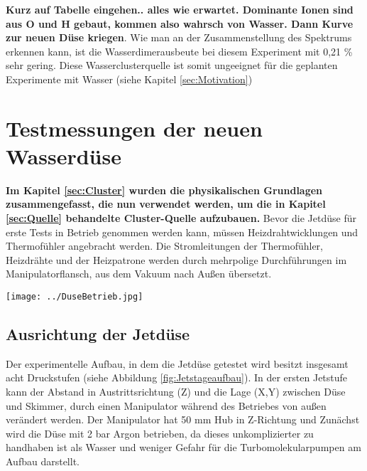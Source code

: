 \textbf{Kurz auf Tabelle eingehen.. alles wie erwartet. Dominante Ionen sind aus O und H gebaut, kommen also wahrsch von Wasser. Dann Kurve zur neuen Düse kriegen}.
Wie man an der Zusammenstellung des Spektrums erkennen kann, ist die Wasserdimerausbeute bei diesem Experiment mit 0,21 \% sehr gering. Diese Wasserclusterquelle ist somit ungeeignet für die geplanten Experimente mit Wasser (siehe Kapitel \ref{sec:Motivation})

\section{Testmessungen der neuen Wasserdüse}

\textbf{Im Kapitel \ref{sec:Cluster} wurden die physikalischen Grundlagen zusammengefasst, die nun verwendet werden, um die in Kapitel \ref{sec:Quelle} \textbf{behandelte} Cluster-Quelle aufzubauen.}
Bevor die Jetdüse für erste Tests in Betrieb genommen werden kann, müssen Heizdrahtwicklungen und Thermofühler angebracht werden. Die Stromleitungen der Thermofühler, Heizdrähte und der Heizpatrone werden durch mehrpolige Durchführungen im Manipulatorflansch, aus dem Vakuum nach Außen übersetzt. 

\begin{center}
\begin{minipage}{\linewidth}
\centering
\texttt{[image: ../DuseBetrieb.jpg]}%
 \label{fig:DuseBetrieb}
\end{minipage} 
\end{center} 

\subsection{Ausrichtung der Jetdüse} \label{sec:Ausrichtung der Jetduse}

Der experimentelle Aufbau, in dem die Jetdüse getestet wird besitzt insgesamt acht Druckstufen (siehe Abbildung \ref{fig:Jetstageaufbau}). In der ersten Jetstufe kann der Abstand in Austrittsrichtung (Z) und die Lage (X,Y) zwischen Düse und Skimmer, durch einen Manipulator während des Betriebes von außen verändert werden. Der Manipulator hat 50 mm Hub in Z-Richtung und  Zunächst wird die Düse mit 2 bar Argon betrieben, da dieses unkomplizierter zu handhaben ist als Wasser und weniger Gefahr für die Turbomolekularpumpen am Aufbau darstellt. 

